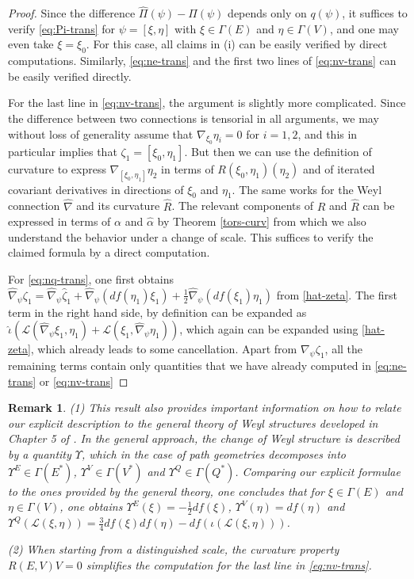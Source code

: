 \documentclass[11pt]{amsart}
\newtheorem{remark}[proposition]{Remark}
\numberwithin{proposition}{section}
\numberwithin{equation}{section}
\begin{document}
\begin{proof}
Since the difference $\hat\Pi(\psi)-\Pi(\psi)$ depends only on $q(\psi)$, it suffices to verify
\eqref{eq:Pi-trans} for $\psi=[\xi,\eta]$ with $\xi\in\Gamma(E)$ and $\eta\in\Gamma(V)$, and one may even take $\xi=\xi_0$. For this case, all claims in (i) can be easily verified by direct computations.  Similarly, \eqref{eq:ne-trans} and the first two lines of \eqref{eq:nv-trans} can be easily verified directly. 

For the last line in \eqref{eq:nv-trans}, the argument is slightly more complicated. Since the difference between two connections is tensorial in all arguments, we may without loss of generality assume that $\nabla_{\xi_0}\eta_i=0$ for $i=1,2$, and this in particular implies that $\zeta_1=[\xi_0,\eta_1]$. But then we can use the definition of curvature to express $\nabla_{[\xi_0,\eta_1]}\eta_2$ in terms of $R(\xi_0,\eta_1)(\eta_2)$ and of iterated covariant derivatives in directions of $\xi_0$ and $\eta_1$. The same works for the Weyl connection $\hat\nabla$ and its curvature $\hat R$. The relevant components of $R$ and $\hat R$ can be expressed in terms of $\alpha$ and $\hat\alpha$ by Theorem \ref{tors-curv} from which we also understand the behavior under a change of scale. This suffices to verify the claimed formula by a direct computation. 

For \eqref{eq:nq-trans}, one first obtains $\hat\nabla_\psi \zeta_1=\hat\nabla_\psi\hat\zeta_1+\hat\nabla_\psi(df(\eta_1)\xi_1)+\tfrac12\hat\nabla_\psi(df(\xi_1)\eta_1)$ from \eqref{hat-zeta}. The first term in the right hand side, by definition can be expanded as $\hat\iota(\mathcal L(\hat\nabla_{\psi}\xi_1,\eta_1)+\mathcal L(\xi_1,\hat\nabla_\psi\eta_1))$, which again can be expanded using \eqref{hat-zeta}, which already leads to some cancellation. Apart from $\nabla_\psi\zeta_1$, all the remaining terms contain only quantities that we have already computed in \eqref{eq:ne-trans} or \eqref{eq:nv-trans}    
\end{proof}

\begin{remark}\label{rem4.2}
(1) This result also provides important information on how to relate our explicit description to the general theory of Weyl structures developed in Chapter 5 of \cite{Book}. In the general approach, the change of Weyl structure is described by a quantity $\Upsilon$, which in the case of path geometries decomposes into $\Upsilon^E\in\Gamma(E^*)$, $\Upsilon^V\in\Gamma(V^*)$ and $\Upsilon^Q\in\Gamma(Q^*)$. Comparing our explicit formulae to the ones provided by the general theory, one concludes that for $\xi\in\Gamma(E)$ and $\eta\in\Gamma(V)$, one obtains $\Upsilon^E(\xi)=-\frac12df(\xi)$, $\Upsilon^V(\eta)=df(\eta)$ and $\Upsilon^Q(\mathcal{L}(\xi,\eta))=\frac34df(\xi)df(\eta)-df(\iota(\mathcal{L}(\xi,\eta)))$.  

(2) When starting from a distinguished scale, the curvature property $R(E,V)V=0$ simplifies the computation for the last line in \eqref{eq:nv-trans}.
\end{remark}
\end{document}

